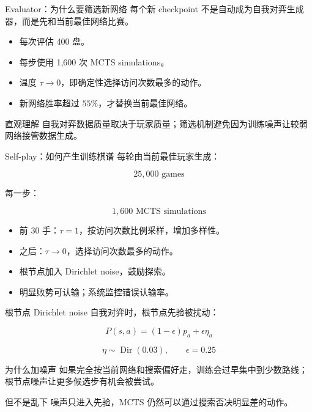 \documentclass[UTF8,aspectratio=169,10pt]{ctexbeamer}
\begin{document}
\begin{frame}{Evaluator：为什么要筛选新网络}
  每个新 checkpoint 不是自动成为自我对弈生成器，而是先和当前最佳网络比赛。

  \begin{itemize}
    \item 每次评估 400 盘。
    \item 每步使用 1,600 次 MCTS simulations。
    \item 温度 $\tau \to 0$，即确定性选择访问次数最多的动作。
    \item 新网络胜率超过 $55\%$，才替换当前最佳网络。
  \end{itemize}

  \begin{block}{直观理解}
    自我对弈数据质量取决于玩家质量；筛选机制避免因为训练噪声让较弱网络接管数据生成。
  \end{block}
\end{frame}

\begin{frame}{Self-play：如何产生训练棋谱}
  每轮由当前最佳玩家生成：

  \[
    25,000 \text{ games}
  \]

  每一步：

  \[
    1,600 \text{ MCTS simulations}
  \]

  \begin{itemize}
    \item 前 30 手：$\tau=1$，按访问次数比例采样，增加多样性。
    \item 之后：$\tau\to0$，选择访问次数最多的动作。
    \item 根节点加入 Dirichlet noise，鼓励探索。
    \item 明显败势可认输；系统监控错误认输率。
  \end{itemize}
\end{frame}

\begin{frame}{根节点 Dirichlet noise}
  自我对弈时，根节点先验被扰动：

  \[
    P(s,a)=(1-\epsilon)p_a+\epsilon\eta_a
  \]

  \[
    \eta \sim \operatorname{Dir}(0.03),\qquad \epsilon=0.25
  \]

  \begin{block}{为什么加噪声}
    如果完全按当前网络和搜索偏好走，训练会过早集中到少数路线；根节点噪声让更多候选步有机会被尝试。
  \end{block}

  \begin{alertblock}{但不是乱下}
    噪声只进入先验，MCTS 仍然可以通过搜索否决明显差的动作。
  \end{alertblock}
\end{frame}
\end{document}
